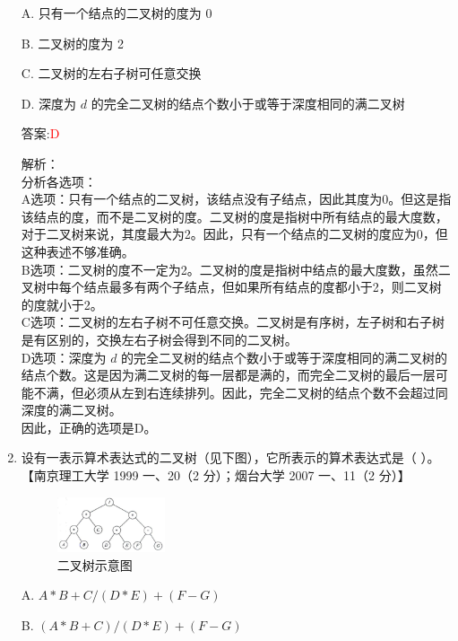 \documentclass[lang=cn,newtx,10pt,scheme=chinese]{../../../elegantbook}
\begin{document}
\begin{enumerate}
    A. 只有一个结点的二叉树的度为 0  

    B. 二叉树的度为 2  

    C. 二叉树的左右子树可任意交换  

    D. 深度为 $d$ 的完全二叉树的结点个数小于或等于深度相同的满二叉树  
    
    答案:\textcolor{red}{D}
    
    解析：\\
    分析各选项：\\
    A选项：只有一个结点的二叉树，该结点没有子结点，因此其度为0。但这是指该结点的度，而不是二叉树的度。二叉树的度是指树中所有结点的最大度数，对于二叉树来说，其度最大为2。因此，只有一个结点的二叉树的度应为0，但这种表述不够准确。\\
    
    B选项：二叉树的度不一定为2。二叉树的度是指树中结点的最大度数，虽然二叉树中每个结点最多有两个子结点，但如果所有结点的度都小于2，则二叉树的度就小于2。\\
    
    C选项：二叉树的左右子树不可任意交换。二叉树是有序树，左子树和右子树是有区别的，交换左右子树会得到不同的二叉树。\\
    
    D选项：深度为 $d$ 的完全二叉树的结点个数小于或等于深度相同的满二叉树的结点个数。这是因为满二叉树的每一层都是满的，而完全二叉树的最后一层可能不满，但必须从左到右连续排列。因此，完全二叉树的结点个数不会超过同深度的满二叉树。\\
    
    因此，正确的选项是D。\\  

    \item 设有一表示算术表达式的二叉树（见下图），它所表示的算术表达式是（ ）。  
    【南京理工大学 1999 一、20（2 分）；烟台大学 2007 一、11（2 分）】  

    \begin{figure}[h!]
        \centering
        \includegraphics[width=0.3\textwidth]{../../figure/exercisePicPDF/chapter6/6-30.pdf}
        \caption{二叉树示意图}
    \end{figure}

    A. $A \ast B + C / (D \ast E) + (F - G)$  

    B. $(A \ast B + C) / (D \ast E) + (F - G)$  


\end{enumerate}
\end{document}
